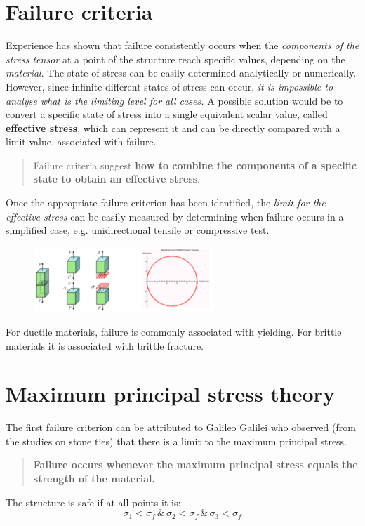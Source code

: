 \documentclass[class=report, crop=false, 12pt,a4paper]{standalone}
\begin{document}
\section{Failure criteria}
Experience has shown that failure consistently occurs when the \textit{components of the stress tensor} at a point of the structure reach specific values, depending on the \textit{material}. The state of stress can be easily determined analytically or numerically. However, since infinite different states of stress can occur, \textit{it is impossible to analyse what is the limiting level for all cases.} A possible solution would be to convert a specific state of stress into a single equivalent scalar value, called \textbf{effective stress}, which can represent it and can be  directly compared with a limit value, associated with failure.
\begin{quotation}
  Failure criteria suggest \textbf{how to combine the components of a specific state to obtain an effective stress}.
\end{quotation}
Once the appropriate failure criterion has been identified, the \textit{limit for the effective stress} can be easily measured by determining when failure occurs in a simplified case, e.g. unidirectional tensile or compressive test.
\begin{figure}[H]
  \centering
  \includegraphics[width = 0.6\textwidth]{../img/diagram77.png}
  \caption{}
\end{figure}
For ductile materials, failure is commonly associated with yielding. For brittle materials it is associated with brittle fracture. 
\section{Maximum principal stress theory}
The first failure criterion can be attributed to Galileo Galilei who observed (from the studies on stone ties) that there is a limit to the maximum principal stress. 
\begin{quotation}
  \textbf{Failure occurs whenever the maximum principal stress equals the strength of the material.}
\end{quotation}
The structure is safe if at all points it is:
\begin{equation}
  \sigma_1 < \sigma_f \, \& \, \sigma_2 < \sigma_f \, \& \, \sigma_3 < \sigma_f
\end{equation}
\end{document}
